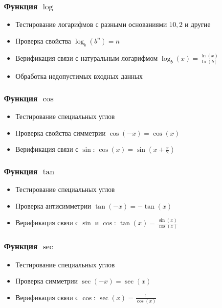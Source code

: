 \subsubsection{Функция \(\log\)}
\begin{itemize}
  \item Тестирование логарифмов с разными основаниями \(10, 2\) и другие
  \item Проверка свойства \(\log_b(b^n) = n\)
  \item Верификация связи с натуральным логарифмом \(\log_b(x) = \frac{\ln(x)}{\ln(b)}\)
  \item Обработка недопустимых входных данных
\end{itemize}

\subsubsection{Функция \(\cos\)}
\begin{itemize}
  \item Тестирование специальных углов
  \item Проверка свойства симметрии \(\cos(-x) = \cos(x)\)
  \item Верификация связи с \(\sin\): \(\cos(x) = \sin(x + \frac{\pi}{2})\)
\end{itemize}

\subsubsection{Функция \(\tan\)}
\begin{itemize}
  \item Тестирование специальных углов
  \item Проверка антисимметрии \(\tan(-x) = -\tan(x)\)
  \item Верификация связи с \(\sin\) и \(\cos\): \(\tan(x) = \frac{\sin(x)}{\cos(x)}\)
\end{itemize}

\subsubsection{Функция \(\sec\)}
\begin{itemize}
  \item Тестирование специальных углов
  \item Проверка симметрии \(\sec(-x) = \sec(x)\)
  \item Верификация связи с \(\cos\): \(\sec(x) = \frac{1}{\cos(x)}\)
\end{itemize}

